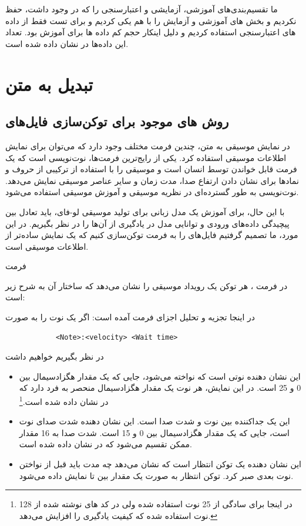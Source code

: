ما تقسیم‌بندی‌های آموزشی، آزمایشی و اعتبارسنجی را که در  وجود داشت، حفظ
نکردیم و بخش های آموزشی و آزمایش را با هم یکی کردیم و برای تست فقط از داده های اعتبارسنجی استفاده کردیم و دلیل اینکار حجم کم داده ها برای آموزش بود. تعداد این داده‌ها در  نشان داده شده است.

\section{تبدیل  به متن}\label{se:tokenizer}

\subsection{روش های موجود برای توکن‌سازی فایل‌های }

در نمایش موسیقی به متن، چندین فرمت مختلف وجود دارد که می‌توان برای نمایش اطلاعات
موسیقی استفاده کرد. یکی از رایج‌ترین فرمت‌ها، نوت‌نویسی  است
که یک فرمت قابل خواندن توسط انسان است و موسیقی را با استفاده از ترکیبی
از حروف و نمادها برای نشان دادن ارتفاع صدا، مدت زمان و سایر عناصر موسیقی
نمایش می‌دهد. نوت‌نویسی  به طور گسترده‌ای در نظریه موسیقی و آموزش موسیقی
استفاده می‌شود.

با این حال، برای آموزش یک مدل زبانی برای تولید موسیقی
لو-فای، باید تعادل بین پیچیدگی داده‌های ورودی و توانایی مدل در
یادگیری از آن‌ها را در نظر بگیریم. در این مورد، ما تصمیم گرفتیم فایل‌های
 را به فرمت  توکن‌سازی کنیم که یک نمایش ساده‌تر از
اطلاعات موسیقی است.

فرمت 

در فرمت ، هر توکن یک رویداد موسیقی را نشان می‌دهد که
ساختار آن به شرح زیر است:

در اینجا تجزیه و تحلیل اجزای فرمت آمده است:
اگر یک نوت را به صورت
\begin{LTR}
      \begin{verbatim}
            <Note>:<velocity> <Wait time>
      \end{verbatim}
\end{LTR}
در نظر بگیریم خواهیم داشت

\begin{itemize}
      \item[\lr{<Note>}]
            این نشان دهنده نوتی است که نواخته می‌شود، جایی که  یک مقدار هگزادسیمال بین 0 و 25 است. در این نمایش، هر نوت یک مقدار هگزادسیمال منحصر به فرد دارد که در  نشان داده شده است.\footnote{در اینجا برای سادگی از 25 نوت استفاده شده ولی در کد های نوشته شده از 128 نوت استفاده شده که کیفیت یادگیری را افزایش می‌دهد.}
      \item[\lr{<velocity>}]  این یک جداکننده بین نوت و شدت صدا است.
            این نشان دهنده شدت صدای نوت است، جایی که  یک مقدار هگزادسیمال بین 0 و 15 است. شدت صدا به 16 مقدار ممکن تقسیم می‌شود که در  نشان داده شده است.
      \item[ \lr{<Wait time>}]
            این نشان دهنده یک توکن انتظار است که نشان می‌دهد چه مدت باید قبل از نواختن نوت بعدی صبر کرد. توکن انتظار به صورت یک مقدار بین  تا  نمایش داده می‌شود.
\end{itemize}

